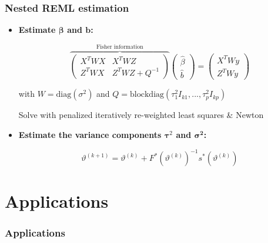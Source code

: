 \documentclass[final]{beamer}
\begin{document}





\begin{frame}
\frametitle{Nested REML estimation}
\begin{itemize}

\item \textbf{Estimate $\boldsymbol{\beta}$ and $\mathbf{b}$:} 

$$\overbrace{\begin{pmatrix}
X^TWX & X^TWZ \\
Z^TWX & Z^TWZ + Q^{-1}
\end{pmatrix}}^{\text{Fisher information}}
\begin{pmatrix}
\hat{\beta} \\
\hat{b}
\end{pmatrix} =
\begin{pmatrix}
X^TWy \\
Z^TWy
\end{pmatrix}$$

 with $W=\text{diag}(\sigma^2)$ and $Q=\text{blockdiag}(\tau_1^2I_{k1},..., \tau_p^2I_{kp})$

Solve with penalized iteratively re-weighted least squares \& Newton

\item \textbf{Estimate the variance components $\boldsymbol{\tau}^2 $ and $\boldsymbol{\sigma^2}$:}

$$\vartheta^{(k+1)} = \vartheta^{(k)} + F^*(\vartheta^{(k)})^{-1}s^*(\vartheta^{(k)})$$


\end{itemize}


\end{frame}



\section{Applications}

\begin{frame}
\frametitle{Applications}


\end{frame}
\end{document}
